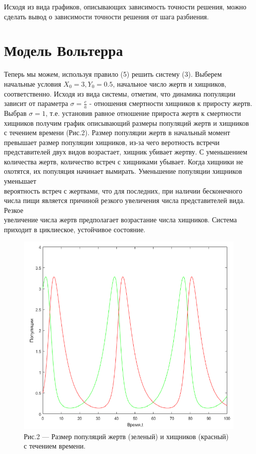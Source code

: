 \documentclass[a4paper,12pt]{article}
\begin{document}
Исходя из вида графиков, описывающих зависимость точности решения, можно сделать вывод
о зависимости точности решения от шага разбиения. 

\newpage


\section{Модель Вольтерра}
\hspace{0.5cm} Теперь мы можем, используя правило (5) решить систему (3). Выберем начальные условия
$X_0 = 3, Y_0 = 0.5$, начальное число жертв и хищников, соответственно. Исходя из вида системы, отметим, что
динамика популяции зависит от параметра $\sigma = \frac{c}{a}$ - отношения смертности хищников к приросту жертв.
Выбрав $\sigma = 1$, т.е. установив равное отношение прироста жертв к смертности хищников получим график 
описывающий размеры популяций жертв и хищников с течением времени (Рис.2). Размер популяции жертв 
в начальный момент превышает размер популяции хищников, из-за чего веротность встречи представителей двух
видов возрастает, хищник убивает жертву. С уменьшением количества жертв, количество встреч 
с хищниками убывает. Когда хищники не охотятся, их популяция начинает вымирать. Уменьшение популяции хищников уменьшает \\
вероятность встреч с жертвами, что для последних, при наличии бесконечного числа пищи 
является причиной резкого увеличения числа представителей вида. Резкое \\
увеличение числа жертв предполагает возрастание числа хищников. Система приходит в циклиеское, устойчивое состояние. 
\begin{figure}[h]
    \centering
    \includegraphics[width=0.5\linewidth]{pictures/task1.png}
    \captionsetup{labelformat=empty}
    \caption{Рис.2 --- Размер популяций жертв (зеленый) и хищников (красный) с течением времени.}
\end{figure}
\newpage
\end{document}
